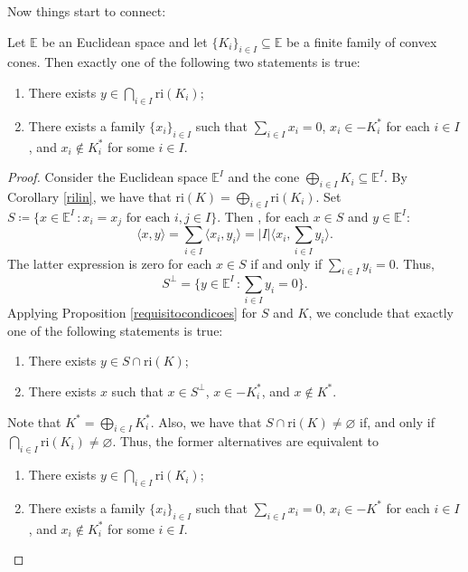 \documentclass[a4paper]{article}
\begin{document}
Now things start to connect:

\begin{corollary}\label{umprimeiro}
Let \(\mathbb{E}\) be an Euclidean space and let \(\{K_i\}_{i\in I}\subseteq\mathbb{E}\) be a
finite family of convex cones. Then exactly one of the following two statements is
true:
\begin{enumerate}[label=(\roman*)]
\item There exists \(y\in\bigcap_{i\in I}\text{ri}(K_i)\);
\item There exists a family \(\{x_i\}_{i\in I}\) such that \(\sum_{i\in
    I}x_i=0\), \(x_i\in -K_i^\ast\) for each \(i\in I\), and \(x_i\not\in
  K_i^\ast\) for some \(i\in I\).
\end{enumerate}
\end{corollary}

\begin{proof}
Consider the Euclidean space \(\mathbb{E}^I\) and the cone \(\bigoplus_{i\in
  I}K_i\subseteq \mathbb{E}^I\). By Corollary \ref{rilin}, we have that
\(\text{ri}(K)=\bigoplus_{i\in I}\text{ri}(K_i)\). Set
\(S\coloneqq\{x\in\mathbb{E}^I\,\colon x_i=x_j \text{ for each } i,j\in I\}\).
Then , for each \(x\in S\) and $y\in\mathbb{E}^I$:
$$\langle x,y\rangle=\sum_{i\in I}\langle x_i,y_i\rangle=\vert I\vert \langle x_i,\sum_{i\in I}y_i\rangle.$$
The latter expression is zero for each $x\in S$ if and only if $\sum_{i\in
  I}y_i=0$. Thus, $$S^\bot=\{y\in\mathbb{E}^I\,\colon \sum_{i\in
    I}y_i=0\}.$$ Applying Proposition \ref{requisitocondicoes} for \(S\) and
\(K\), we conclude that exactly one of the following statements is true:
\begin{enumerate}[label=(\roman*)]
\item There exists \(y\in S\cap\text{ri}(K)\);
\item There exists \(x\) such that \(x\in S^\bot\), \(x\in -K_i^\ast\), and
  \(x\not\in K^\ast\).
\end{enumerate}

Note that \(K^\ast=\bigoplus_{i\in I}K_i^\ast\).
Also, we have that \(S\cap\text{ri}(K)\not=\varnothing\) if, and only if \mbox{\(\bigcap_{i\in
  I}\text{ri}(K_i)\not=\varnothing\)}. Thus, the former alternatives are equivalent to 
\begin{enumerate}[label=(\roman*)]
\item There exists \(y\in\bigcap_{i\in I}\text{ri}(K_i)\);
\item There exists a family \(\{x_i\}_{i\in I}\) such that \(\sum_{i\in
    I}x_i=0\), \(x_i\in -K^\ast\) for each \(i\in I\), and \(x_i\not\in
  K_i^\ast\) for some \(i\in I\).\qedhere
\end{enumerate}
\end{proof}
\end{document}
